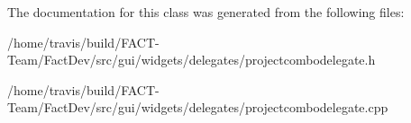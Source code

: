 The documentation for this class was generated from the following files\-:\begin{DoxyCompactItemize}
\item 
/home/travis/build/\-F\-A\-C\-T-\/\-Team/\-Fact\-Dev/src/gui/widgets/delegates/projectcombodelegate.\-h\item 
/home/travis/build/\-F\-A\-C\-T-\/\-Team/\-Fact\-Dev/src/gui/widgets/delegates/projectcombodelegate.\-cpp\end{DoxyCompactItemize}
